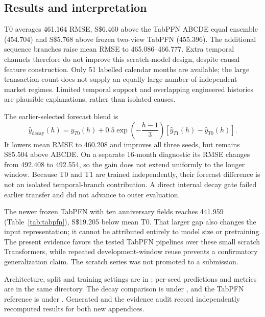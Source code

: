 \documentclass[conference]{IEEEtran}
\newcommand{\sgd}{S\$}
\begin{document}
\begin{table}[!ht]
\caption{TabPFN references on the identical recent-window rows (SGD). CDE is the earlier-selected family; ABCDE equal is an equal-weight sensitivity combining an adapter and frozen feature views. Both differ from the later anniversary model. These are complete-pipeline comparisons, not controlled tests of pretraining alone.}
\label{tab:scratchtabpfn}
\centering\small

\end{table}

\subsection{Results and interpretation}
T0 averages 461.164 RMSE, \sgd6.460 above the TabPFN ABCDE equal ensemble (454.704) and \sgd5.768 above frozen two-view TabPFN (455.396). The additional sequence branches raise mean RMSE to 465.086--466.777. Extra temporal channels therefore do not improve this scratch-model design, despite causal feature construction. Only 51 labelled calendar months are available; the large transaction count does not supply an equally large number of independent market regimes. Limited temporal support and overlapping engineered histories are plausible explanations, rather than isolated causes.

The earlier-selected forecast blend is
{\normalsize
\[
\widehat y_{\mathrm{decay}}(h)=\widehat y_{T0}(h)+0.5\exp\!\left(-\frac{h-1}{3}\right)
\left[\widehat y_{T1}(h)-\widehat y_{T0}(h)\right].
\]
}
It lowers mean RMSE to 460.208 and improves all three seeds, but remains \sgd5.504 above ABCDE. On a separate 16-month diagnostic its RMSE changes from 492.408 to 492.554, so the gain does not extend uniformly to the longer window. Because T0 and T1 are trained independently, their forecast difference is not an isolated temporal-branch contribution. A direct internal decay gate failed earlier transfer and did not advance to outer evaluation.

The newer frozen TabPFN with ten anniversary fields reaches 441.959 (Table~\ref{tab:tabpfn}), \sgd19.205 below mean T0. That larger gap also changes the input representation; it cannot be attributed entirely to model size or pretraining. The present evidence favors the tested TabPFN pipelines over these small scratch Transformers, while repeated development-window reuse prevents a confirmatory generalization claim. The scratch series was not promoted to a submission.

Architecture, split and training settings are in ; per-seed predictions and metrics are in the same directory. The decay comparison is under , and the TabPFN reference is under . Generated  and the evidence audit record independently recomputed results for both new appendices.
\par\endgroup
\end{document}
